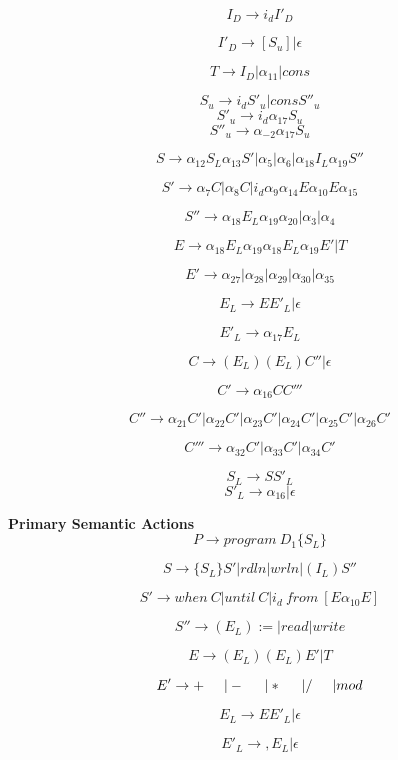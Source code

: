 \documentclass[11pt]{article}
\begin{document}
\[ I_D	 \to  	i_d I'_D \]

\[  I'_D \to [ S_u ]  | \epsilon \]

\[ T\to I_D | \alpha_{11} | cons \]

\[ S_u \to	i_d S'_u | cons S''_u \]
\[ S'_u \to i_d \alpha_{17} S_u  \]
\[ S''_u \to \alpha_{-2} \alpha_{17} S_u \]

\[ S \to \alpha_{12} S_L \alpha_{13} S' |  \alpha_5 | \alpha_6 |  \alpha_{18} I_L \alpha_{19} S'' \]

\[ S' \to \alpha_7 C | \alpha_8 C | i_d \alpha_{9} \alpha_{14} E \alpha_{10} E \alpha_{15} \]

\[ S'' \to \alpha_{18} E_L \alpha_{19} \alpha_{20} | \alpha_{3} | \alpha_{4} \]

\[ E \to \alpha_{18} E_L \alpha_{19}  \alpha_{18} E_L \alpha_{19}  E' | T \]

\[ E' \to  \alpha_{27} | \alpha_{28} | \alpha_{29} | \alpha_{30} |  \alpha_{35} \]

\[ E_L \to E E'_L | \epsilon \]

\[ E'_L \to \alpha_{17} E_L \]

\[ C \to (E_L )(E_L) C'' | \epsilon  \]

\[C' \to \alpha_{16} C C'''\]

\[ C'' \to \alpha _{21} C' | \alpha _{22} C' | \alpha _{23} C' | \alpha _{24} C' | \alpha _{25} C' | \alpha _{26}  C' \]

\[ C''' \to \alpha_{32} C' | \alpha_{33} C' | \alpha_{34} C' \]

\[ S_L \to S S'_L\]
\[S'_L \to \alpha_{16} | \epsilon\] 

\textbf {Primary Semantic Actions}
\[ P\to program\  D_1 \{ S_L \}\]

\[ S \to \{ S_L \} S' |  rdln | wrln |  ( I_L ) S'' \]

\[ S' \to when \ C | until \ C | i_d \ from \ [ E \alpha_{10} E ] \]

\[ S'' \to ( E_L ) := | read | write \]

\[ E \to ( E_L )  ( E_L )  E' | T \]

\[ E' \to  + \hspace{0.5 cm}| - \hspace{0.5 cm} | \ast \hspace{0.5 cm}| / \hspace{0.5 cm} |  mod \]

\[ E_L \to E E'_L | \epsilon \]

\[ E'_L \to , E_L | \epsilon \]
\end{document}
